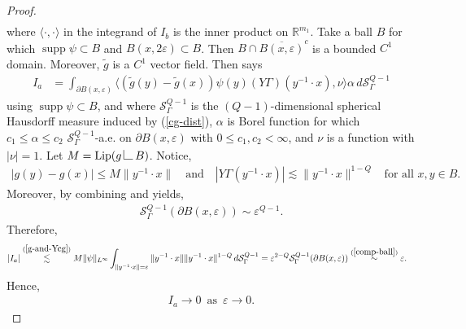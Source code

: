 \documentclass[12pt,a4paper,reqno]{amsart}
\DeclareMathOperator{\supp}{supp}
\newcommand{\wt}{\widetilde}
\newcommand{\cg}{\Gamma}
\newcommand{\R}{\mathbb{R}}
\renewcommand{\a}{\alpha}
\numberwithin{equation}{section}
\theoremstyle{definition}
\newcommand{\restrict}{\begin{picture}(12,12)
                        \put(2,0){\line(1,0){8}}
                        \put(2,0){\line(0,1){8}}
                       \end{picture}}
\begin{document}
\begin{proof}
\begin{align*}
\end{align*}
where $\langle \cdot, \cdot \rangle$ in the integrand of $I_b$ is the inner product on $\R^{m_1}$.
Take a ball $B$ for which $\supp \psi \subset B$ and $B(x,2 \varepsilon) \subset B$. Then $B \cap \overline{B(x, \varepsilon)}^c$ is a bounded $C^1$ domain. Moreover, $\wt{g}$ is a $C^1$ vector field. Then \cite[(3.12)]{CMT} says \begin{align*}
    I_a &= \int_{\partial B(x, \varepsilon)} \langle (\wt{g}(y) - \wt{g}(x))\psi(y) (Y \cg)(y^{-1}\cdot x), \nu \rangle \a\, d\mathcal{S}_{\cg}^{Q-1} 
\end{align*}
using $\supp \psi \subset B$, and where $\mathcal{S}_{\cg}^{Q-1}$ is the $(Q-1)$-dimensional spherical Hausdorff measure induced by (\ref{cg-dist}), $\a$ is Borel function for which $c_1 \leq \a \leq c_2$ $\mathcal{S}_{\cg}^{Q-1}$-a.e. on $\partial B(x,\varepsilon)$ with $0 \leq c_1, c_2 < \infty$, and $\nu$ is a function with $|\nu| = 1$. Let $M = \text{Lip}(g\restrict B)$.
Notice, \begin{align}
    |g(y) - g(x)| \leq M \| y^{-1}\cdot x\| \quad \text{and} \quad |Y \cg(y^{-1}\cdot x)| \lesssim \| y^{-1}\cdot x\|^{1-Q} \,\,\,\text{ for all }x,y \in B. \label{g-and-Ycg}
\end{align}
Moreover, by combining \cite[Theorem 4.1]{M} and \cite[Theorem 1.2 (1.12) $\wedge$ (1.13) $\wedge$ (1.14)]{CG} yields, \begin{align}
 \mathcal{S}_{\cg}^{Q-1}(\partial B(x, \varepsilon)) \sim \varepsilon^{Q-1}.   \label{comp-ball}
\end{align}
Therefore, \begin{align*}
    |I_a| &\overset{(\ref{g-and-Ycg})}{\lesssim} M \| \psi\|_{L^{\infty}} \int_{\| y^{-1}\cdot x\| = \varepsilon} \| y^{-1}\cdot  x\|\| y^{-1}\cdot x\|^{1-Q}\, d \mathcal{S}_{\cg}^{Q-1} = \varepsilon^{2-Q} \mathcal{S}_{\cg}^{Q-1}(\partial B(x, \varepsilon)) \overset{(\ref{comp-ball})}{\sim} \varepsilon.
\end{align*}
Hence, \begin{align}
    I_{a} \rightarrow 0\, \text{ as }\, \varepsilon \rightarrow 0. \label{ia-zero}
\end{align}


\end{proof}
\end{document}
